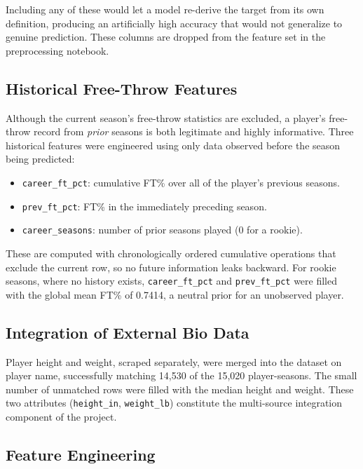 \documentclass[conference]{IEEEtran}
\begin{document}
Including any of these would let a model re-derive the target from its own definition, producing an artificially high accuracy that would not generalize to genuine prediction. These columns are dropped from the feature set in the preprocessing notebook.

\subsection{Historical Free-Throw Features}

Although the current season's free-throw statistics are excluded, a player's free-throw record from \textit{prior} seasons is both legitimate and highly informative. Three historical features were engineered using only data observed before the season being predicted:

\begin{itemize}
\item \texttt{career\_ft\_pct}: cumulative FT\% over all of the player's previous seasons.
\item \texttt{prev\_ft\_pct}: FT\% in the immediately preceding season.
\item \texttt{career\_seasons}: number of prior seasons played (0 for a rookie).
\end{itemize}

These are computed with chronologically ordered cumulative operations that exclude the current row, so no future information leaks backward. For rookie seasons, where no history exists, \texttt{career\_ft\_pct} and \texttt{prev\_ft\_pct} were filled with the global mean FT\% of 0.7414, a neutral prior for an unobserved player.

\subsection{Integration of External Bio Data}

Player height and weight, scraped separately, were merged into the dataset on player name, successfully matching 14{,}530 of the 15{,}020 player-seasons. The small number of unmatched rows were filled with the median height and weight. These two attributes (\texttt{height\_in}, \texttt{weight\_lb}) constitute the multi-source integration component of the project.

\subsection{Feature Engineering}
\end{document}
